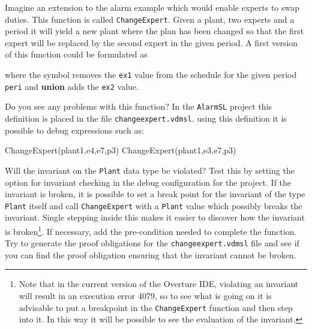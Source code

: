 \begin{myhardexercise}
\label{ex:tool-alarm} Imagine an extension to the alarm example which would enable experts to swap duties. This function is called \texttt{ChangeExpert}. Given a plant, two experts and a period it will
yield a new plant where the plan has been changed so that the first expert will be replaced by the second expert in the given period. A first version of this function could be formulated as
\begin{vdmsl}
ChangeExpert: Plant * Expert * Expert * Period -> Plant
ChangeExpert(mk_Plant(plan,alarms),ex1,ex2,peri) ==
  mk_Plant(plan ++ {peri |-> plan(peri)\{ex1} union {ex2}},
           alarms)
\end{vdmsl}
\noindent where the \texttt{\SETDIFF} symbol removes the \texttt{ex1} value from the schedule for the given period \texttt{peri} and {\bf\ttfamily union} adds the \texttt{ex2} value.

Do you see any problems with this function? In the \texttt{AlarmSL} project this definition is placed
in the file \texttt{changeexpert.vdmsl}.
using this definition it is possible to debug expressions such as:
\begin{vdmsl}
ChangeExpert(plant1,e4,e7,p3)
ChangeExpert(plant1,e3,e7,p3)
\end{vdmsl}
Will the invariant on the \texttt{Plant} data type be violated?  Test this by setting the option for invariant checking in the debug configuration for the project. If the invariant is broken, it is possible to set a break point for the invariant of the type \texttt{Plant} itself and call \texttt{ChangeExpert} with a \texttt{Plant} value which possibly breaks the invariant. Single stepping inside this makes it easier to discover how the invariant is broken\footnote{Note that in the current version of the Overture IDE, violating an invariant will result in an execution error 4079, so to see what is going on it is advisable to put a breakpoint in the \texttt{ChangeExpert} function and then step into it.  In this way it will be possible to see the evaluation of the invariant.}.  If necessary, add the pre-condition needed to complete the function. Try to generate the proof obligations for the \texttt{changeexpert.vdmsl} file and see if you can find the proof obligation ensuring that the invariant cannot be broken.
\end{myhardexercise}